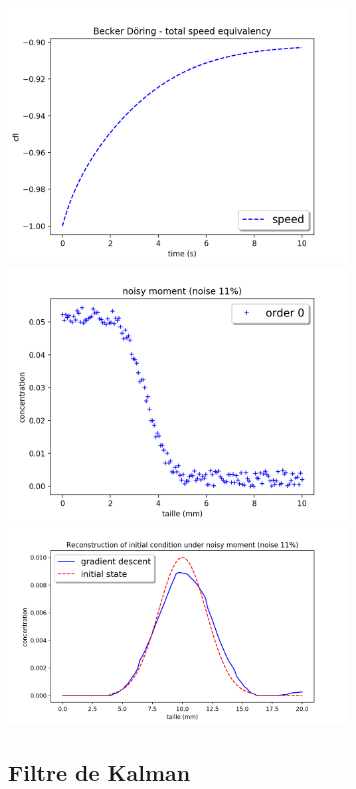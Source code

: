 \documentclass[a4paper]{article}
\begin{document}
\includegraphics[width=9cm]{OLD/speed.png}
\includegraphics[width=9cm]{OLD/noise.png}
\includegraphics[width=9cm]{OLD/y0noise11.png}





		  

 


\subsection{Filtre de Kalman}
\end{document}
